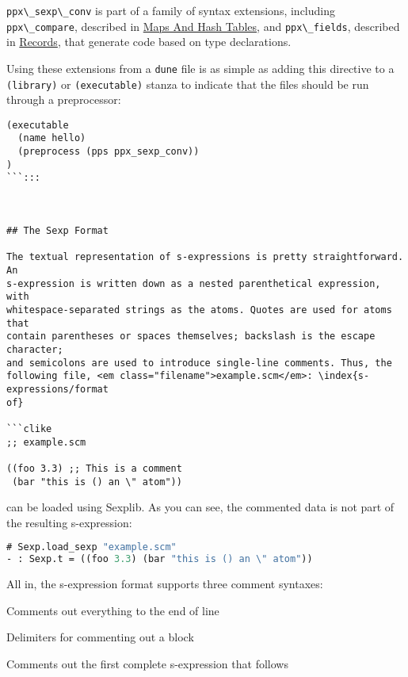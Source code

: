 \passthrough{\lstinline!ppx\_sexp\_conv!} is part of a family of syntax
extensions, including \passthrough{\lstinline!ppx\_compare!}, described
in \href{maps-and-hashtables.html\#maps-and-hash-tables}{Maps And Hash
Tables}, and \passthrough{\lstinline!ppx\_fields!}, described in
\href{records.html\#records}{Records}, that generate code based on type
declarations.

Using these extensions from a \passthrough{\lstinline!dune!} file is as
simple as adding this directive to a \passthrough{\lstinline!(library)!}
or \passthrough{\lstinline!(executable)!} stanza to indicate that the
files should be run through a preprocessor:

\begin{lstlisting}
(executable
  (name hello)
  (preprocess (pps ppx_sexp_conv))
)
```:::



## The Sexp Format

The textual representation of s-expressions is pretty straightforward. An
s-expression is written down as a nested parenthetical expression, with
whitespace-separated strings as the atoms. Quotes are used for atoms that
contain parentheses or spaces themselves; backslash is the escape character;
and semicolons are used to introduce single-line comments. Thus, the
following file, <em class="filename">example.scm</em>: \index{s-expressions/format
of}

```clike
;; example.scm

((foo 3.3) ;; This is a comment
 (bar "this is () an \" atom"))
\end{lstlisting}

can be loaded using Sexplib. As you can see, the commented data is not
part of the resulting s-expression:

\begin{lstlisting}[language=Caml]
# Sexp.load_sexp "example.scm"
- : Sexp.t = ((foo 3.3) (bar "this is () an \" atom"))
\end{lstlisting}

All in, the s-expression format supports three comment syntaxes:

\begin{description}
\tightlist
\item[\texttt{;}]
Comments out everything to the end of line
\item[\texttt{\#\textbar{},\textbar{}\#}]
Delimiters for commenting out a block
\item[\texttt{\#;}]
Comments out the first complete s-expression that follows
\end{description}

